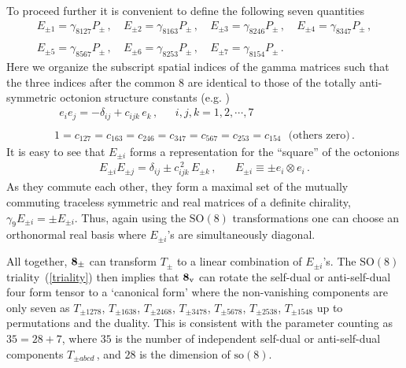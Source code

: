 \documentclass[a4paper,11pt]{article}
\begin{document}
To proceed further it is convenient to define the following seven quantities
\begin{equation}
\begin{array}{cccc}
E_{\pm 1}=\gamma_{8127}P_{\pm}\,,~&E_{\pm 2}=\gamma_{8163}P_{\pm}\,,~&E_{\pm 3}=\gamma_{8246}P_{\pm}\,,~& E_{\pm
4}=\gamma_{8347}P_{\pm}\,,\\ {}&{}&{}&{}\\ E_{\pm 5}=\gamma_{8567}P_{\pm}\,,~&E_{\pm 6}=\gamma_{8253}P_{\pm}\,,~&
E_{\pm 7}=\gamma_{8154}P_{\pm}\,.&{}
\end{array}
\label{Edef}
\end{equation}
Here we organize the  subscript spatial indices  of the gamma matrices such that the three  indices after the common $8$ are  identical to those of
the totally anti-symmetric octonion structure constants (e.g. \cite{Baez})
\begin{equation}
\begin{array}{c}
~~e_{i}e_{j}=-\delta_{ij}+c_{ijk}\,e_{k}\,,~~~~~~~{i,j,k=1,2,\cdots,7}\\ {}\\
1=c_{127}=c_{163}=c_{246}=c_{347}=c_{567}=c_{253}=c_{154}~~~\mbox{(others zero)}\,.
\end{array}
\end{equation}
It is easy  to see that  $E_{\pm i}$ forms a representation for the ``square'' of the octonions
\begin{equation}
\begin{array}{cc}
E_{\pm i}E_{\pm j}=\delta_{ij}\pm c^{\,2}_{ijk}\,E_{\pm k}\,,~~&~~
E_{\pm i}\equiv\pm e_{i}\otimes e_{i}\,.
\end{array}
\label{square}
\end{equation}
As they commute each other, they  form   a maximal set of the  mutually commuting  traceless  symmetric and real  matrices of a definite chirality,
$\gamma_{9}E_{\pm i}=\pm E_{\pm i}$. Thus, again using the $\mbox{SO}(8)$ transformations one can choose  an orthonormal real basis where $E_{\pm
i}$'s are simultaneously diagonal.




All together, ${\bf 8}_{\pm}$ can transform $T_{\pm}$ to a linear combination of $E_{\pm i}$'s.  The $\mbox{SO}(8)$ triality~(\ref{triality}) then
implies that ${\bf 8}_{{\rm v}}$ can rotate the self-dual or anti-self-dual four form tensor to a `canonical form' where the non-vanishing
components are only seven as $T_{\pm 1278}$, $T_{\pm 1638}$, $T_{\pm 2468}$, $T_{\pm 3478}$, $T_{\pm 5678}$, $T_{\pm 2538}$, $T_{\pm 1548}$ up to
permutations and the duality.  This is consistent with the parameter counting as $35=28+7$, where $35$ is the number of independent self-dual or
anti-self-dual components $T_{\pm abcd}$\,, and $28$ is the dimension of $\mbox{so}(8)$.
\end{document}
